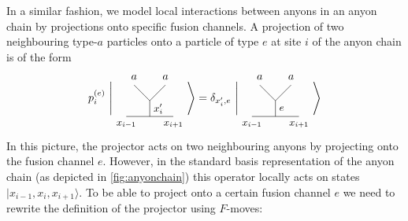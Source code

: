 In a similar fashion, we model local interactions between anyons in an anyon chain by projections onto specific fusion channels. A projection of two neighbouring type-$a$ particles onto a particle of type $e$ at site $i$ of the anyon chain is of the form
	\begin{equation}
		p_i^{(e)}\ \Bigg|
		\begin{tikzpicture}[baseline=(current bounding box.center)]
			\draw (0.25,0) -- (1.75,0);
			\draw (1,0) to node[right] {\small $x_i'$} (1,0.5);
			\draw (1,0.5) -- (0.5,1);
			\draw (1,0.5) -- (1.5,1);
			\node at (0.25,-0.25) {\small $x_{i-1}$};
			\node at (1.75,-0.25) {\small $x_{i+1}$};
			\node at (0.5,1.25) {$a$};
			\node at (1.5,1.25) {$a$};
		\end{tikzpicture}\Bigg\rangle=\delta_{x_i',e}\ \Bigg|
		\begin{tikzpicture}[baseline=(current bounding box.center)]
			\draw (0.25,0) -- (1.75,0);
			\draw (1,0) to node[right] {\small $e$} (1,0.5);
			\draw (1,0.5) -- (0.5,1);
			\draw (1,0.5) -- (1.5,1);
			\node at (0.25,-0.25) {\small $x_{i-1}$};
			\node at (1.75,-0.25) {\small $x_{i+1}$};
			\node at (0.5,1.25) {$a$};
			\node at (1.5,1.25) {$a$};
		\end{tikzpicture}\Bigg\rangle		
	\end{equation}
In this picture, the projector acts on two neighbouring anyons by projecting onto the fusion channel $e$. However, in the standard basis representation of the anyon chain (as depicted in \cref{fig:anyonchain}) this operator locally acts on states $|x_{i-1},x_i,x_{i+1}\rangle$. To be able to project onto a certain fusion channel $e$ we need to rewrite the definition of the projector using $F$-moves:
